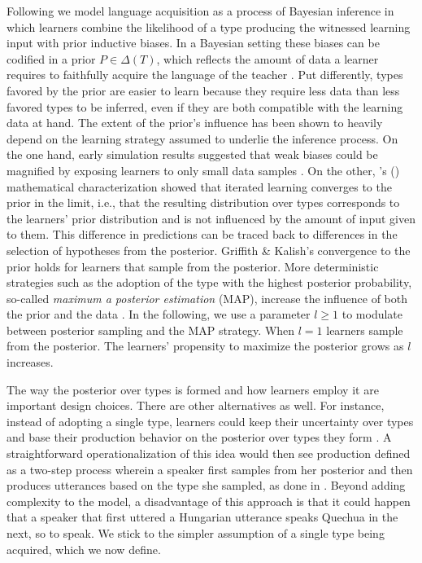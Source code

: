 \documentclass[a4paper, 11pt]{article}
\theoremstyle{Satz}
\newcommand{\citeposs}[2][]{\citeauthor{#2}'s (\citeyear[#1]{#2})}
\begin{document}
Following \citet{griffiths+kalish:2005,griffiths+kalish:2007} we model language acquisition as a process of Bayesian
inference in which learners combine the likelihood of a type producing the witnessed learning
input with prior inductive biases. In a Bayesian setting these biases can be codified in a prior
$P \in \Delta(T)$, which reflects the amount of data a learner requires to faithfully acquire
the language of the teacher \citep[cf.][450]{griffiths+kalish:2007}. Put differently, types favored by the prior are easier to learn because they require less data than less favored types to be inferred, even if they are both compatible with the learning data at hand. The extent of the prior's
influence has been shown to heavily depend on the learning strategy assumed to underlie the
inference process. On the one hand, early simulation results suggested that weak biases could
be magnified by exposing learners to only small data samples
\citep[e.g. in][]{brighton:2002}. On the other, \citeposs{griffiths+kalish:2007} mathematical
characterization showed that iterated learning converges to the prior in the limit, i.e., that
the resulting distribution over types corresponds to the learners' prior distribution and
is not influenced by the amount of input given to them. This difference in predictions can be
traced back to differences in the selection of hypotheses from the posterior. Griffith \&
Kalish's convergence to the prior holds for learners that sample from the posterior. More
deterministic strategies such as the adoption of the type with the highest posterior
probability, so-called {\it maximum a posterior estimation} (MAP), increase the influence of
both the prior and the data \citep{griffiths+kalish:2007,kirby+etal:2007}. In the following, we
use a parameter $l\ge1$ to modulate between posterior sampling and the MAP strategy. When
$l = 1$ learners sample from the posterior. The learners' propensity to maximize the posterior
grows as $l$ increases. 

The way the posterior over types is formed and how learners employ it are important design choices. There are other alternatives as well. For instance, instead of adopting a single type, learners could keep their uncertainty over types and base their production behavior on the posterior over types they form \citep{burkett+griffiths:2010}. A straightforward operationalization of this idea would then see production defined as a two-step process wherein a speaker first samples from her posterior and then produces utterances based on the type she sampled, as done in \citealt{kirby+etal:2015}. Beyond adding complexity to the model, a disadvantage of this approach is that it could happen that a speaker that first uttered a Hungarian utterance speaks Quechua in the next, so to speak. We stick to the simpler assumption of a single type being acquired, which we now define.
\end{document}
